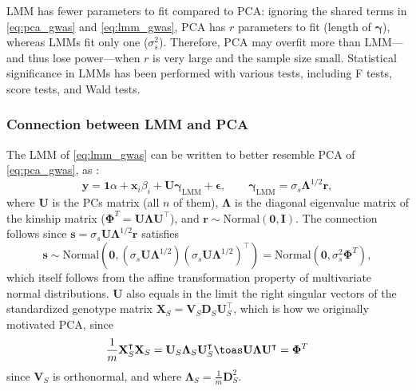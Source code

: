 \documentclass[11pt]{article}
\begin{document}
LMM has fewer parameters to fit compared to PCA: ignoring the shared terms in \cref{eq:pca_gwas} and \cref{eq:lmm_gwas}, PCA has $r$ parameters to fit (length of $\boldsymbol{\gamma}$), whereas LMMs fit only one ($\sigma^2_s$).
Therefore, PCA may overfit more than LMM---and thus lose power---when $r$ is very large and the sample size small.
Statistical significance in LMMs has been performed with various tests, including F tests, score tests, and Wald tests.

\subsubsection{Connection between LMM and PCA}

The LMM of \cref{eq:lmm_gwas} can be written to better resemble PCA of \cref{eq:pca_gwas}, as \citep{astle_population_2009, hoffman_correcting_2013}:
\begin{equation}
  \label{eq:lmm_gwas_evd}
  \mathbf{y}
  =
  \mathbf{1} \alpha + \mathbf{x}_i \beta_i + \mathbf{U} \boldsymbol{\gamma}_\text{LMM} + \boldsymbol{\epsilon}
  , \quad\quad
  \boldsymbol{\gamma}_\text{LMM} = \sigma_s \boldsymbol{\Lambda}^{1/2} \mathbf{r}
  ,
\end{equation}
where $\mathbf{U}$ is the PCs matrix (all $n$ of them), $\boldsymbol{\Lambda}$ is the diagonal eigenvalue matrix of the kinship matrix ($\mathbf{\Phi}^T = \mathbf{U} \boldsymbol{\Lambda} \mathbf{U}^\intercal$), and $\mathbf{r} \sim \text{Normal}(\mathbf{0},\mathbf{I})$.
The connection follows since $\mathbf{s} = \sigma_s \mathbf{U} \boldsymbol{\Lambda}^{1/2} \mathbf{r}$ satisfies
$$
\mathbf{s} \sim \text{Normal} \left( \mathbf{0}, \left( \sigma_s \mathbf{U} \boldsymbol{\Lambda}^{1/2} \right) \left( \sigma_s \mathbf{U} \boldsymbol{\Lambda}^{1/2} \right)^\intercal \right)
= \text{Normal}( \mathbf{0}, \sigma_s^2 \mathbf{\Phi}^T ),
$$
which itself follows from the affine transformation property of multivariate normal distributions.
$\mathbf{U}$ also equals in the limit the right singular vectors of the standardized genotype matrix $\mathbf{X}_S = \mathbf{V}_S \mathbf{D}_S \mathbf{U}_S^\intercal$, which is how we originally motivated PCA, since
$$
\frac{1}{m} \mathbf{X}_S^\intercal \mathbf{X}_S
= \mathbf{U}_S \mathbf{\Lambda}_S \mathbf{U}_S^\intercal
\toas
\mathbf{U} \mathbf{\Lambda} \mathbf{U}^\intercal
=
\mathbf{\Phi}^T
$$
since $\mathbf{V}_S$ is orthonormal, and where $\mathbf{\Lambda}_S = \frac{1}{m} \mathbf{D}_S^2$.
\end{document}
